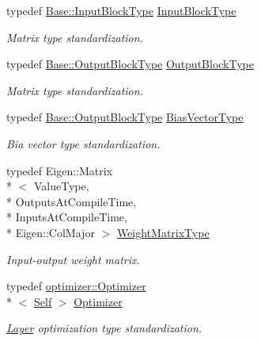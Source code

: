 \begin{DoxyCompactItemize}
typedef \hyperlink{classffnn_1_1layer_1_1_hidden_abd5a3b5c55984948f903fe88759efaf4}{Base\-::\-Input\-Block\-Type} \hyperlink{classffnn_1_1layer_1_1_fully_connected_a1360eaafde26c8b36ddb6fe4095b6119}{Input\-Block\-Type}
\begin{DoxyCompactList}\small\item\em Matrix type standardization. \end{DoxyCompactList}\item 
typedef \hyperlink{classffnn_1_1layer_1_1_hidden_a9fd326932b57e1d86d86bdb168822727}{Base\-::\-Output\-Block\-Type} \hyperlink{classffnn_1_1layer_1_1_fully_connected_a23903ba58825efec173f318ffdc3b998}{Output\-Block\-Type}
\begin{DoxyCompactList}\small\item\em Matrix type standardization. \end{DoxyCompactList}\item 
typedef \hyperlink{classffnn_1_1layer_1_1_hidden_a9fd326932b57e1d86d86bdb168822727}{Base\-::\-Output\-Block\-Type} \hyperlink{classffnn_1_1layer_1_1_fully_connected_afd08719c4360bd1447d1108396b07e57}{Bias\-Vector\-Type}
\begin{DoxyCompactList}\small\item\em Bia vector type standardization. \end{DoxyCompactList}\item 
typedef Eigen\-::\-Matrix\\*
$<$ Value\-Type, \\*
Outputs\-At\-Compile\-Time, \\*
Inputs\-At\-Compile\-Time, \\*
Eigen\-::\-Col\-Major $>$ \hyperlink{classffnn_1_1layer_1_1_fully_connected_aef17d91a349bf83f5e5a20462ebb3c81}{Weight\-Matrix\-Type}
\begin{DoxyCompactList}\small\item\em Input-\/output weight matrix. \end{DoxyCompactList}\item 
typedef \hyperlink{classffnn_1_1optimizer_1_1_optimizer}{optimizer\-::\-Optimizer}\\*
$<$ \hyperlink{classffnn_1_1layer_1_1_fully_connected_ac41b1867a1a4e8c9c9eaa892db2ab805}{Self} $>$ \hyperlink{classffnn_1_1layer_1_1_fully_connected_abae398e6ffb06d183654e5ff11857a03}{Optimizer}
\begin{DoxyCompactList}\small\item\em \hyperlink{classffnn_1_1layer_1_1_layer}{Layer} optimization type standardization. \end{DoxyCompactList}\end{DoxyCompactItemize}
